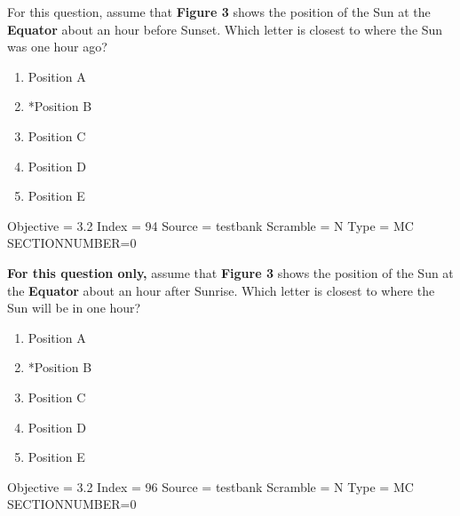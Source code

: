 \documentclass[11pt]{article}
\begin{document}
\begin{enumerate}
\begin{minipage}{\textwidth}
\begin{minipage}{\textwidth}
\item For this question, assume that {\bf Figure 3} shows the position of the Sun at the {\bf Equator} about an hour before Sunset.   Which letter is closest to where the Sun was one hour ago?
\begin{multicols}{3}
\begin{enumerate} 
\setlength{\itemsep}{1pt} 
\setlength{\parskip}{0pt} 
\setlength{\parsep}{0pt}
\setlength{\multicolsep}{1pt} 
\item Position A
\item *Position B
\item Position C
\item Position D
\item Position E
\end{enumerate} 
\vfill 
\end{multicols}

Objective = 3.2
Index = 94
Source = testbank
Scramble = N
Type = MC
SECTIONNUMBER=0
\end{minipage}
\end{minipage}
\vskip 0.20in

\begin{minipage}{\textwidth}
\begin{minipage}{\textwidth}
\item {\bf For this question only,} assume that {\bf Figure 3} shows the position of the Sun at the {\bf Equator} about an hour after Sunrise.   Which letter is closest to where the Sun will be in one hour?
\begin{multicols}{3}
\begin{enumerate} 
\setlength{\itemsep}{1pt} 
\setlength{\parskip}{0pt} 
\setlength{\parsep}{0pt}
\setlength{\multicolsep}{1pt} 
\item Position A
\item *Position B
\item Position C
\item Position D
\item Position E
\end{enumerate} 
\vfill 
\end{multicols}

Objective = 3.2
Index = 96
Source = testbank
Scramble = N
Type = MC
SECTIONNUMBER=0
\end{minipage}
\end{minipage}
\vskip 0.20in


\end{enumerate}
\end{document}
